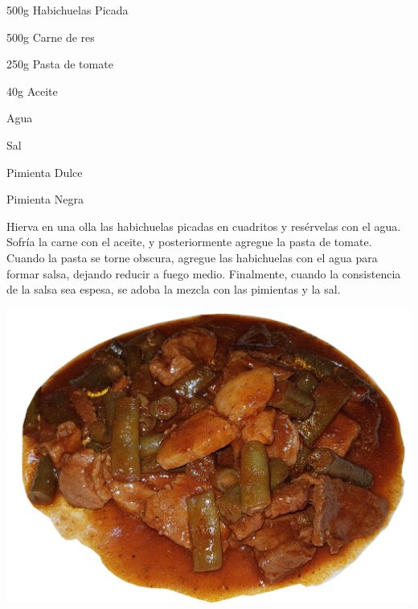 

\begin{ingredientes}
\item 500g Habichuelas Picada
\item 500g Carne de res
\item 250g Pasta de tomate
\item 40g Aceite
\item Agua
\item Sal
\item Pimienta Dulce
\item Pimienta Negra
\end{ingredientes}
\preparacion

Hierva en una olla las habichuelas picadas en cuadritos y resérvelas con el agua. Sofría la carne con el aceite, y posteriormente agregue la pasta de tomate. Cuando  la pasta se torne obscura, agregue las habichuelas con el agua para formar salsa, dejando reducir a fuego medio. Finalmente, cuando la consistencia de la salsa sea espesa, se adoba la mezcla con las pimientas y la sal.\\

\clearpage
\vspace*{5cm}
\begin{center}
\includegraphics[width=\textwidth]{fotos/habichuelas.jpg} 
\end{center}


